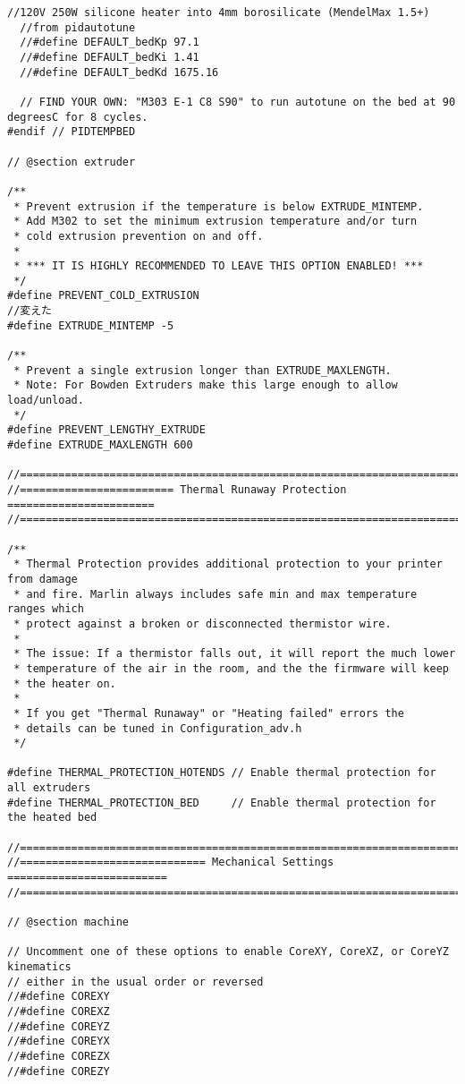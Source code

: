 \begin{lstlisting}[caption = キャプション, label = ラベル]
  //120V 250W silicone heater into 4mm borosilicate (MendelMax 1.5+)
  //from pidautotune
  //#define DEFAULT_bedKp 97.1
  //#define DEFAULT_bedKi 1.41
  //#define DEFAULT_bedKd 1675.16

  // FIND YOUR OWN: "M303 E-1 C8 S90" to run autotune on the bed at 90 degreesC for 8 cycles.
#endif // PIDTEMPBED

// @section extruder

/**
 * Prevent extrusion if the temperature is below EXTRUDE_MINTEMP.
 * Add M302 to set the minimum extrusion temperature and/or turn
 * cold extrusion prevention on and off.
 *
 * *** IT IS HIGHLY RECOMMENDED TO LEAVE THIS OPTION ENABLED! ***
 */
#define PREVENT_COLD_EXTRUSION
//変えた
#define EXTRUDE_MINTEMP -5

/**
 * Prevent a single extrusion longer than EXTRUDE_MAXLENGTH.
 * Note: For Bowden Extruders make this large enough to allow load/unload.
 */
#define PREVENT_LENGTHY_EXTRUDE
#define EXTRUDE_MAXLENGTH 600

//===========================================================================
//======================== Thermal Runaway Protection =======================
//===========================================================================

/**
 * Thermal Protection provides additional protection to your printer from damage
 * and fire. Marlin always includes safe min and max temperature ranges which
 * protect against a broken or disconnected thermistor wire.
 *
 * The issue: If a thermistor falls out, it will report the much lower
 * temperature of the air in the room, and the the firmware will keep
 * the heater on.
 *
 * If you get "Thermal Runaway" or "Heating failed" errors the
 * details can be tuned in Configuration_adv.h
 */

#define THERMAL_PROTECTION_HOTENDS // Enable thermal protection for all extruders
#define THERMAL_PROTECTION_BED     // Enable thermal protection for the heated bed

//===========================================================================
//============================= Mechanical Settings =========================
//===========================================================================

// @section machine

// Uncomment one of these options to enable CoreXY, CoreXZ, or CoreYZ kinematics
// either in the usual order or reversed
//#define COREXY
//#define COREXZ
//#define COREYZ
//#define COREYX
//#define COREZX
//#define COREZY


\end{lstlisting}
